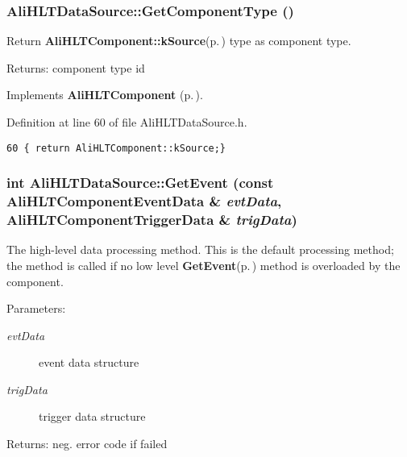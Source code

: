 \subsubsection{ Ali\-HLTData\-Source::Get\-Component\-Type ()\hspace{0.3cm}{\tt  [inline, virtual]}}\label{classAliHLTDataSource_a3}


Return {\bf Ali\-HLTComponent::k\-Source}{\rm (p.\,\pageref{classAliHLTComponent_w9w1})} type as component type. \begin{Desc}
\item[Returns:]component type id \end{Desc}


Implements {\bf Ali\-HLTComponent} {\rm (p.\,\pageref{classAliHLTComponent_a8})}.

Definition at line 60 of file Ali\-HLTData\-Source.h.

\footnotesize\begin{verbatim}60 { return AliHLTComponent::kSource;}
\end{verbatim}\normalsize 


\subsubsection{\setlength{\rightskip}{0pt plus 5cm}int Ali\-HLTData\-Source::Get\-Event (const {\bf Ali\-HLTComponent\-Event\-Data} \& {\em evt\-Data}, {\bf Ali\-HLTComponent\-Trigger\-Data} \& {\em trig\-Data})\hspace{0.3cm}{\tt  [private, virtual]}}\label{classAliHLTDataSource_d1}


The high-level data processing method. This is the default processing method; the method is called if no low level {\bf Get\-Event}{\rm (p.\,\pageref{classAliHLTDataSource_d0})} method is overloaded by the component. \begin{Desc}
\item[Parameters:]
\begin{description}
\item[{\em evt\-Data}]event data structure \item[{\em trig\-Data}]trigger data structure \end{description}
\end{Desc}
\begin{Desc}
\item[Returns:]neg. error code if failed \end{Desc}



